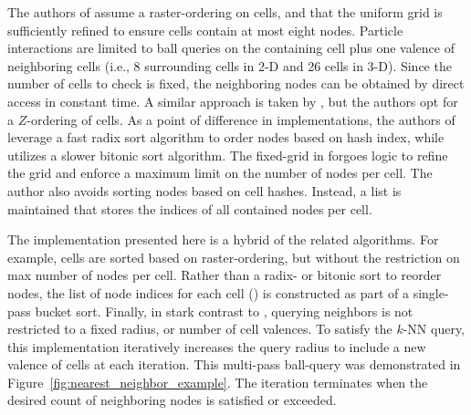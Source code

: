 \documentclass{report}
\begin{document}
The authors of \cite{Krog2010,Johnson2011,Green2010} assume a raster-ordering on cells, and that the uniform grid is sufficiently refined to ensure cells contain at most eight nodes. Particle interactions are limited to ball queries on the containing cell plus one valence of neighboring cells (i.e., 8 surrounding cells in 2-D and 26 cells in 3-D). Since the number of cells to check is fixed, the neighboring nodes can be obtained by direct access in constant time. A similar approach is taken by \cite{Goswami2010}, but the authors opt for a $Z$-ordering of cells. 
 As a point of difference in implementations, the authors of \cite{Green2010, Krog2010, Goswami2010} leverage a fast radix sort algorithm to order nodes based on hash index, while \cite{Johnson2011} utilizes a slower bitonic sort algorithm. The fixed-grid in \cite{Wendland2002,WendlandBook} forgoes logic to refine the grid and enforce a maximum limit on the number of nodes per cell. The author also avoids sorting nodes based on cell hashes. Instead, a list is maintained that stores the indices of all contained nodes per cell. %


The implementation presented here is a hybrid of the related algorithms. For example, cells are sorted based on raster-ordering, but without the restriction on max number of nodes per cell. Rather than a radix- or bitonic sort to reorder nodes, the list of node indices for each cell (\cite{Wendland2002,WendlandBook}) is constructed as part of a single-pass bucket sort. Finally, in stark contrast to  \cite{Krog2010,Green2010,Johnson2011,Wendland2002,WendlandBook}, querying neighbors is not restricted to a fixed radius, or number of cell valences. To satisfy the $k$-NN query, this implementation iteratively increases the query radius to include a new valence of cells at each iteration. This multi-pass ball-query was demonstrated in Figure~\ref{fig:nearest_neighbor_example}. The iteration terminates when the desired count of neighboring nodes is satisfied or exceeded.
\end{document}
